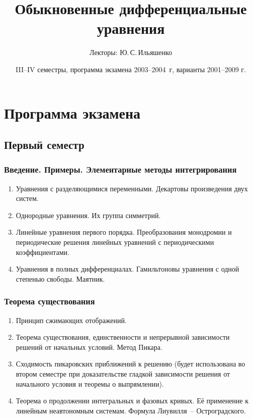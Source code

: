 \documentclass[a4paper]{article}
\title{Обыкновенные дифференциальные уравнения}
\author{Лекторы: \framebox{В.\,А.\,Кондратьев,} Ю.\,С.\,Ильяшенко}
\date{III--IV семестры, программа экзамена 2003--2004~г, варианты 2001--2009 г.}
\begin{document}
\maketitle

\section{Программа экзамена}

\subsection{Первый семестр}

\subsubsection*{Введение. Примеры. Элементарные методы интегрирования}
\begin{enumerate}
\setlength\itemsep{-1.5mm}
\item Уравнения с разделяющимися переменными. Декартовы произведения двух систем.
\item Однородные уравнения. Их группа симметрий.
\item Линейные уравнения первого порядка. Преобразования монодромии и периодические решения
линейных уравнений с периодическими коэффициентами.
\item Уравнения в полных дифференциалах. Гамильтоновы уравнения с одной степенью свободы. Маятник.
\end{enumerate}

\subsubsection{Теорема существования}
\begin{enumerate}
\setlength\itemsep{-1.5mm}
\item Принцип сжимающих отображений.
\item Теорема существования, единственности и непрерывной зависимости решений от начальных условий. Метод Пикара.
\item Сходимость пикаровских приближений к решению (будет использована во втором семестре при доказательстве гладкой
зависимости решения от начального условия и теоремы о выпрямлении).
\item Теорема о продолжении интегральных и фазовых кривых. Её применение к линейным неавтономным системам.
Формула Лиувилля~-- Остроградского.
\end{enumerate}
\end{document}
